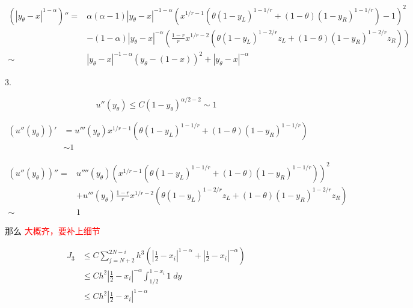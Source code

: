 \documentclass{ctexart}
\theoremstyle{definition}
\theoremstyle{remark}
\numberwithin{equation}{section}
\begin{document}
\begin{equation}
    \begin{aligned}
        (|y_\theta-x|^{1-\alpha})''
        =    & \alpha(\alpha-1)|y_\theta-x|^{-1-\alpha} (x^{1/r-1}(\theta (1-y_L)^{1-1/r} + (1-\theta)(1-y_R)^{1-1/r}) - 1)^2            \\
             & - (1-\alpha)|y_\theta-x|^{-\alpha}(\frac{1-r}{r} x^{1/r-2} (\theta (1-y_L)^{1-2/r} z_L + (1-\theta) (1-y_R)^{1-2/r} z_R)) \\
        \sim & |y_\theta-x|^{-1-\alpha} (y_\theta - (1-x))^2 + |y_\theta-x|^{-\alpha}
    \end{aligned}
\end{equation}


3.

\begin{equation}
    u''(y_\theta) \le C (1-y_\theta)^{\alpha/2-2} \sim 1
\end{equation}


\begin{equation}
    \begin{aligned}
        (u''(y_\theta))' & = u'''(y_\theta) x^{1/r-1}(\theta (1-y_L)^{1-1/r} + (1-\theta) (1-y_R)^{1-1/r}) \\
                         & \sim 1
    \end{aligned}
\end{equation}

\begin{equation}
    \begin{aligned}
        (u''(y_\theta))'' =
             & u''''(y_\theta) (x^{1/r-1}(\theta (1-y_L)^{1-1/r} + (1-\theta) (1-y_R)^{1-1/r}))^2                 \\
             & + u'''(y_\theta)\frac{1-r}{r} x^{1/r-2}(\theta (1-y_L)^{1-2/r}z_L + (1-\theta) (1-y_R)^{1-2/r}z_R) \\
        \sim & 1
    \end{aligned}
\end{equation}

那么 \textcolor{red}{大概齐，要补上细节}

\begin{equation}
    \begin{aligned}
        J_3 & \le C \sum_{j=N+2}^{2N-i} h^3 ( |\frac{1}{2}-x_i|^{1-\alpha} +  |\frac{1}{2}-x_i|^{-\alpha} ) \\
            & \le C h^2 |\frac{1}{2}-x_i|^{-\alpha} \int_{1/2}^{1-x_i} 1 \; dy                              \\
            & \le C h^2 |\frac{1}{2}-x_i|^{1-\alpha}
    \end{aligned}
\end{equation}
\end{document}
